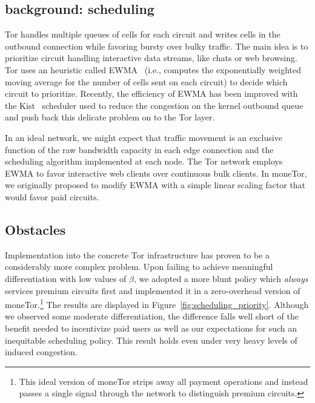 \subsection{background: scheduling}

Tor handles multiple queues of cells for each circuit and writes cells in the
outbound connection while favoring bursty over bulky traffic. The main idea is
to prioritize circuit handling interactive data streams, like chats or web
browsing. Tor uses an heuristic called EWMA~\cite{tang2010improved} (i.e.,
computes the exponentially weighted moving average for the number of cells sent
on each circuit) to decide which circuit to prioritize. Recently, the efficiency
of EWMA has been improved with the Kist~\cite{jansen2014never} scheduler used to
reduce the congestion on the kernel outbound queue and push back this delicate
problem on to the Tor layer.

In an ideal network, we might expect that traffic movement is an exclusive
function of the raw bandwidth capacity in each edge connection and the
scheduling algorithm implemented at each node.  The Tor network employs EWMA to
favor interactive web clients over continuous bulk clients. In moneTor, we
originally proposed to modify EWMA with a simple linear scaling factor that
would favor paid circuits.

\subsection{Obstacles}

Implementation into the concrete Tor infrastructure has proven to be a
considerably more complex problem. Upon failing to achieve meaningful
differentiation with low values of $\beta$, we adopted a more blunt policy which
\emph{always} services premium circuits first and implemented it in a
zero-overhead version of moneTor.\footnote{This ideal version of moneTor strips
  away all payment operations and instead passes a single signal through the
  network to distinguish premium circuits.} The results are displayed in
Figure~\ref{fig:scheduling_priority}. Although we observed some moderate
differentiation, the difference falls well short of the benefit needed to
incentivize paid users as well as our expectations for such an inequitable
scheduling policy. This result holds even under very heavy levels of induced
congestion.


